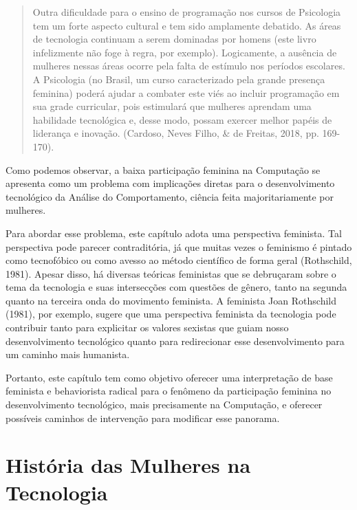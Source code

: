 \begin{quote}
    Outra dificuldade para o ensino de programação nos cursos de Psicologia tem um forte aspecto cultural e tem sido amplamente debatido. As áreas de tecnologia continuam a serem dominadas por homens (este livro infelizmente não foge à regra, por exemplo). Logicamente, a ausência de mulheres nessas áreas ocorre pela falta de estímulo nos períodos escolares. A Psicologia (no Brasil, um curso caracterizado pela grande presença feminina) poderá ajudar a combater este viés ao incluir programação em sua grade curricular, pois estimulará que mulheres aprendam uma habilidade tecnológica e, desse modo, possam exercer melhor papéis de liderança e inovação. (Cardoso, Neves Filho, \& de Freitas, 2018, pp. 169-170).
\end{quote}

Como podemos observar, a baixa participação feminina na Computação se apresenta como um problema com implicações diretas para o desenvolvimento tecnológico da Análise do Comportamento, ciência feita majoritariamente por mulheres. 

Para abordar esse problema, este capítulo adota uma perspectiva feminista. Tal perspectiva pode parecer contraditória, já que muitas vezes o feminismo é pintado como tecnofóbico ou como avesso ao método científico de forma geral (Rothschild, 1981). Apesar disso, há diversas teóricas feministas que se debruçaram sobre o tema da tecnologia e suas intersecções com questões de gênero, tanto na segunda quanto na terceira onda do movimento feminista. A feminista Joan Rothschild (1981), por exemplo, sugere que uma perspectiva feminista da tecnologia pode contribuir tanto para explicitar os valores sexistas que guiam nosso desenvolvimento tecnológico quanto para redirecionar esse desenvolvimento para um caminho mais humanista. 

Portanto, este capítulo tem como objetivo oferecer uma interpretação de base feminista e behaviorista radical para o fenômeno da participação feminina no desenvolvimento tecnológico, mais precisamente na Computação, e oferecer possíveis caminhos de intervenção para modificar esse panorama. 

\section*{História das Mulheres na Tecnologia}

